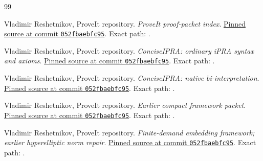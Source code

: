 \begin{thebibliography}{99}
 Vladimir Reshetnikov, ProveIt repository.
\emph{ProveIt proof-packet index}.
\href{https://github.com/VladimirReshetnikov/ProveIt/blob/052fbaebfc955294b4c02f6532ab7e7a3f760f7a/Logic/PrimitiveRecursiveArithmetic/docs/proofs/README.md}{Pinned source at commit \texttt{052fbaebfc95}}.
Exact path: .

 Vladimir Reshetnikov, ProveIt repository.
\emph{ConciseIPRA: ordinary iPRA syntax and axioms}.
\href{https://github.com/VladimirReshetnikov/ProveIt/blob/052fbaebfc955294b4c02f6532ab7e7a3f760f7a/Logic/PrimitiveRecursiveArithmetic/ConciseIPRA/Lean/ConciseIPRA/PR.lean}{Pinned source at commit \texttt{052fbaebfc95}}.
Exact path: .

 Vladimir Reshetnikov, ProveIt repository.
\emph{ConciseIPRA: native bi-interpretation}.
\href{https://github.com/VladimirReshetnikov/ProveIt/blob/052fbaebfc955294b4c02f6532ab7e7a3f760f7a/Logic/PrimitiveRecursiveArithmetic/ConciseIPRA/Lean/ConciseIPRA/NativeBiInterpretation.lean}{Pinned source at commit \texttt{052fbaebfc95}}.
Exact path: .

 Vladimir Reshetnikov, ProveIt repository.
\emph{Earlier compact framework packet}.
\href{https://github.com/VladimirReshetnikov/ProveIt/blob/052fbaebfc955294b4c02f6532ab7e7a3f760f7a/Logic/PrimitiveRecursiveArithmetic/docs/proofs/foundations/ipra_framework_2026-11-15/framework.tex}{Pinned source at commit \texttt{052fbaebfc95}}.
Exact path: .

 Vladimir Reshetnikov, ProveIt repository.
\emph{Finite-demand embedding framework; earlier hyperelliptic norm repair}.
\href{https://github.com/VladimirReshetnikov/ProveIt/blob/052fbaebfc955294b4c02f6532ab7e7a3f760f7a/Logic/PrimitiveRecursiveArithmetic/docs/proofs/foundations/ipra_embedding_framework/paper/05_diophantine.tex}{Pinned source at commit \texttt{052fbaebfc95}}.
Exact path: .


\end{thebibliography}
